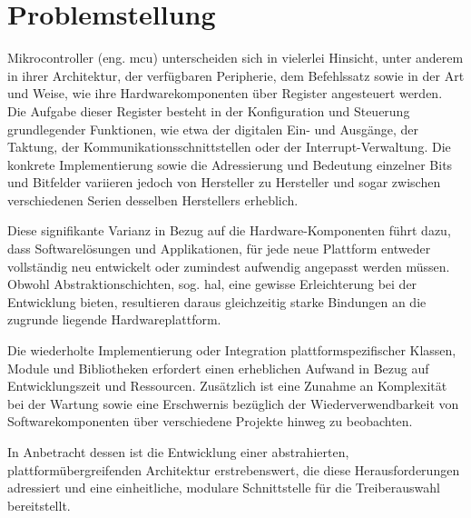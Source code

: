 \section{Problemstellung}
Mikrocontroller (eng. \gls{mcu}) unterscheiden sich in vielerlei Hinsicht, unter anderem in ihrer Architektur, der verfügbaren Peripherie, dem Befehlssatz sowie in der Art und Weise, wie ihre Hardwarekomponenten über Register angesteuert werden.
Die Aufgabe dieser Register besteht in der Konfiguration und Steuerung grundlegender Funktionen, wie etwa der digitalen Ein- und Ausgänge, der Taktung, der Kommunikationsschnittstellen oder der Interrupt-Verwaltung.
Die konkrete Implementierung sowie die Adressierung und Bedeutung einzelner Bits und Bitfelder variieren jedoch von Hersteller zu Hersteller und sogar zwischen verschiedenen Serien desselben Herstellers erheblich.

Diese signifikante Varianz in Bezug auf die Hardware-Komponenten führt dazu, dass Softwarelösungen und Applikationen, für jede neue Plattform entweder vollständig neu entwickelt oder zumindest aufwendig angepasst werden müssen.
Obwohl Abstraktionschichten, sog. \gls{hal}, eine gewisse Erleichterung bei der Entwicklung bieten, resultieren daraus gleichzeitig starke Bindungen an die zugrunde liegende Hardwareplattform.

Die wiederholte Implementierung oder Integration plattformspezifischer Klassen, Module und Bibliotheken erfordert einen erheblichen Aufwand in Bezug auf Entwicklungszeit und Ressourcen.
Zusätzlich ist eine Zunahme an Komplexität bei der Wartung sowie eine Erschwernis bezüglich der Wiederverwendbarkeit von Softwarekomponenten über verschiedene Projekte hinweg zu beobachten.

 In Anbetracht dessen ist die Entwicklung einer abstrahierten, plattformübergreifenden Architektur erstrebenswert, die diese Herausforderungen adressiert und eine einheitliche, modulare Schnittstelle für die Treiberauswahl bereitstellt.



